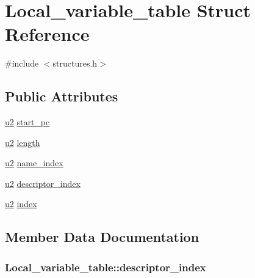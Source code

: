 \hypertarget{structLocal__variable__table}{}\section{Local\+\_\+variable\+\_\+table Struct Reference}
\label{structLocal__variable__table}


{\ttfamily \#include $<$structures.\+h$>$}

\subsection*{Public Attributes}
\begin{DoxyCompactItemize}
\item 
\hyperlink{structures_8h_a55ef8d87fd202b8417704c089899c5b9}{u2} \hyperlink{structLocal__variable__table_a857ab3f5a0d3a22f1eb7eccdd9c034e1}{start\+\_\+pc}
\item 
\hyperlink{structures_8h_a55ef8d87fd202b8417704c089899c5b9}{u2} \hyperlink{structLocal__variable__table_aa7ed2c337f001f6922abef82a7a2877b}{length}
\item 
\hyperlink{structures_8h_a55ef8d87fd202b8417704c089899c5b9}{u2} \hyperlink{structLocal__variable__table_ae14ab32d3cf126ede896ea6b1a7053a2}{name\+\_\+index}
\item 
\hyperlink{structures_8h_a55ef8d87fd202b8417704c089899c5b9}{u2} \hyperlink{structLocal__variable__table_ac30f0857c677e82b9665b709369adb5c}{descriptor\+\_\+index}
\item 
\hyperlink{structures_8h_a55ef8d87fd202b8417704c089899c5b9}{u2} \hyperlink{structLocal__variable__table_aa9c60b3758f3edc8c4761af238e576a9}{index}
\end{DoxyCompactItemize}


\subsection{Member Data Documentation}
\subsubsection[{\texorpdfstring{descriptor\+\_\+index}{descriptor_index}}]{ Local\+\_\+variable\+\_\+table\+::descriptor\+\_\+index}\hypertarget{structLocal__variable__table_ac30f0857c677e82b9665b709369adb5c}{}\label{structLocal__variable__table_ac30f0857c677e82b9665b709369adb5c}
